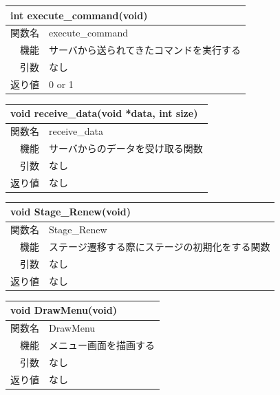 \documentclass{jarticle}
\begin{document}
\begin{table}[H]
\begin{tabular}{|r|l|}
\hline
\multicolumn{2}{|l|}{int execute\_command(void)}       \\ \hline
関数名           & execute\_command \\ \hline
機能     & サーバから送られてきたコマンドを実行する \\
引数     & なし \\
返り値   & 0 or 1 \\ \hline
\end{tabular}
\end{table}


\begin{table}[H]
\begin{tabular}{|r|l|}
\hline
\multicolumn{2}{|l|}{void receive\_data(void *data, int size)}       \\ \hline
関数名   & receive\_data \\ \hline
機能     & サーバからのデータを受け取る関数 \\
引数     & なし \\
返り値   & なし \\ \hline
\end{tabular}
\end{table}


\begin{table}[H]
\begin{tabular}{|r|l|}
\hline
\multicolumn{2}{|l|}{void Stage\_Renew(void)}       \\ \hline
関数名           & Stage\_Renew \\ \hline
機能     & ステージ遷移する際にステージの初期化をする関数 \\
引数     & なし \\
返り値   & なし \\ \hline
\end{tabular}
\end{table}

\begin{table}[H]
\begin{tabular}{|r|l|}
\hline
\multicolumn{2}{|l|}{void DrawMenu(void)}       \\ \hline
関数名           & DrawMenu \\ \hline
機能     & メニュー画面を描画する \\
引数     & なし \\
返り値   & なし \\ \hline
\end{tabular}
\end{table}
\end{document}
